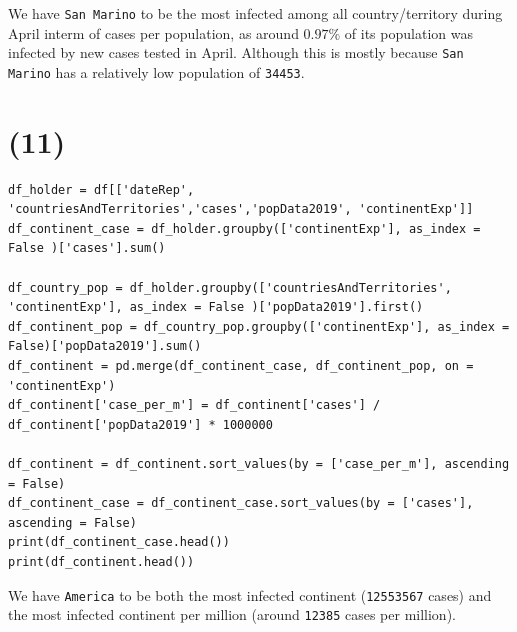 \documentclass[12pt]{article}
\newcommand{\ilc}{\texttt}
\begin{document}
We have \ilc{San Marino} to be the most infected among all country/territory during April interm of cases per population, as around $0.97\%$ of its population was infected by new cases tested in April. Although this is mostly because \ilc{San Marino} has a relatively low population of \ilc{34453}.


\section*{(11)}

\begin{lstlisting}
df_holder = df[['dateRep', 'countriesAndTerritories','cases','popData2019', 'continentExp']]
df_continent_case = df_holder.groupby(['continentExp'], as_index = False )['cases'].sum()

df_country_pop = df_holder.groupby(['countriesAndTerritories', 'continentExp'], as_index = False )['popData2019'].first()
df_continent_pop = df_country_pop.groupby(['continentExp'], as_index = False)['popData2019'].sum()
df_continent = pd.merge(df_continent_case, df_continent_pop, on = 'continentExp')
df_continent['case_per_m'] = df_continent['cases'] / df_continent['popData2019'] * 1000000

df_continent = df_continent.sort_values(by = ['case_per_m'], ascending = False)
df_continent_case = df_continent_case.sort_values(by = ['cases'], ascending = False)
print(df_continent_case.head())
print(df_continent.head())
\end{lstlisting}


We have \ilc{America} to be both the most infected continent (\ilc{12553567} cases) and the most infected continent per million (around \ilc{12385} cases per million).
\end{document}
